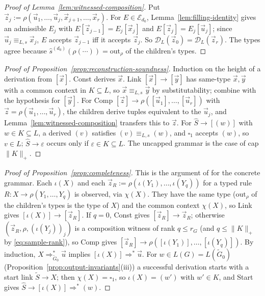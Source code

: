 \documentclass[11pt]{article}
\numberwithin{equation}{section}
\theoremstyle{plain}
\theoremstyle{definition}
\theoremstyle{remark}
\newcommand{\D}{\mathcal{D}}
\newcommand{\out}{\mathrm{out}}
\newcommand{\tuple}[1]{\vec{#1}}
\newcommand{\blank}{\square}
\newcommand{\eps}{\varepsilon}
\theoremstyle{plain}
\begin{document}
\begin{proof}[Proof of Lemma~\ref{lem:witnessed-composition}]
Put $\tuple z_j:=\rho(\tuple u_1,\ldots,\tuple u_j,\tuple x_{j+1},\ldots,\tuple x_r)$.
For $E\in\mathcal E_{d_0}$, Lemma~\ref{lem:filling-identity} gives an admissible $E_j$ with
$E[\tuple z_{j-1}]=E_j[\tuple x_j]$ and $E[\tuple z_j]=E_j[\tuple u_j]$; since
$\tuple u_j\equiv_{L,s}\tuple x_j$, $E$ accepts $\tuple z_{j-1}$ iff it accepts
$\tuple z_j$.  So $\D_L(\tuple z_0)=\D_L(\tuple z_r)$.  The types agree because
$\widehat s^{(d_0)}(\rho(\cdots))=\out_\rho$ of the children's types.
\end{proof}

\begin{proof}[Proof of Proposition~\ref{prop:reconstruction-soundness}]
Induction on the height of a derivation from $[\tuple x]$.  Const derives $\tuple x$.
Link $[\tuple x]\to[\tuple y]$ has same-type $\tuple x,\tuple y$ with a common context
in $K\subseteq L$, so $\tuple x\equiv_{L,s}\tuple y$ by substitutability; combine with
the hypothesis for $[\tuple y]$.  For Comp
$[\tuple z]\to\rho([\tuple u_1],\ldots,[\tuple u_r])$ with $\tuple z=\rho(\tuple u_1,
\ldots,\tuple u_r)$, the children derive tuples equivalent to the $\tuple u_j$, and
Lemma~\ref{lem:witnessed-composition} transfers this to $\tuple z$.  For
$\widehat S\to[(w)]$ with $w\in K\subseteq L$, a derived $(v)$ satisfies
$(v)\equiv_{L,s}(w)$, and $\blank_1$ accepts $(w)$, so $v\in L$; $\widehat S\to\eps$ occurs
only if $\eps\in K\subseteq L$.  The uncapped grammar is the case of cap $\|K\|_+$.
\end{proof}

\begin{proof}[Proof of Proposition~\ref{prop:completeness}]
This is the argument of \cite[Lemma~3]{Yoshinaka2015General} for the concrete
grammar.  Each $\iota(X)$ and each
$\tuple z_R:=\rho(\iota(Y_1),\ldots,\iota(Y_q))$ for a typed rule
$R:X\to\rho(Y_1,\ldots,Y_q)$ is observed, via $\chi(X)$.  They have the same type
($\out_\rho$ of the children's types is the type of $X$) and the common context
$\chi(X)$, so Link gives $[\iota(X)]\to[\tuple z_R]$.  If $q=0$, Const gives
$[\tuple z_R]\to\tuple z_R$; otherwise $(\tuple z_R,\rho,(\iota(Y_j))_j)$ is a
composition witness of rank $q\le r_G$ (and $q\le\|K\|_+$ by \eqref{eq:sample-rank}),
so Comp gives $[\tuple z_R]\to\rho([\iota(Y_1)],\ldots,[\iota(Y_q)])$.  By induction,
$X\Rightarrow^*_{\widetilde G_0}\tuple u$ implies $[\iota(X)]\Rightarrow^*\tuple u$.  For
$w\in L(G)=L(\widetilde G_0)$ (Proposition~\ref{prop:output-invariants}(iii)) a
successful derivation starts with a start link $\widetilde S\to X$; then
$\chi(X)=\blank_1$, so $\iota(X)=(w')$ with $w'\in K$, and Start gives
$\widehat S\to[\iota(X)]\Rightarrow^*(w)$.
\end{proof}
\end{document}

